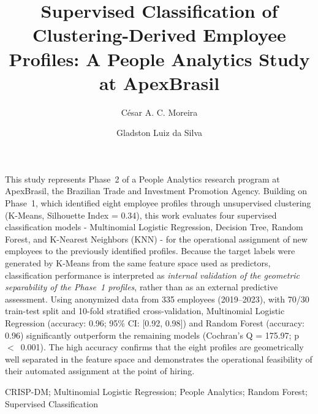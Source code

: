 \documentclass[alpha-refs,english]{RBCA_v3.0}
\title{Supervised Classification of Clustering-Derived Employee Profiles: A People Analytics Study at ApexBrasil}
\author[1]{C\'esar A. C. Moreira \orcid{0009-0001-0248-6791}}
\author[1]{Gladston Luiz da Silva \orcid{0000-0001-9650-2993}}
\affil[1]{Programa de P\'os-Gradua\c{c}\~ao em Computa\c{c}\~ao Aplicada, Universidade de Bras\'ilia (PPCA/UnB), Bras\'ilia, DF, Brazil}
\begin{document}
\begin{frontmatter}

\maketitle
\thispagestyle{empty}

\begin{Abstract}
This study represents Phase~2 of a People Analytics research program at ApexBrasil, the Brazilian Trade and Investment Promotion Agency. Building on Phase~1, which identified eight employee profiles through unsupervised clustering (K-Means, Silhouette Index = 0.34), this work evaluates four supervised classification models - Multinomial Logistic Regression, Decision Tree, Random Forest, and K-Nearest Neighbors (KNN) - for the operational assignment of new employees to the previously identified profiles. Because the target labels were generated by K-Means from the same feature space used as predictors, classification performance is interpreted as \textit{internal validation of the geometric separability of the Phase~1 profiles}, rather than as an external predictive assessment. Using anonymized data from 335 employees (2019--2023), with 70/30 train-test split and 10-fold stratified cross-validation, Multinomial Logistic Regression (accuracy: 0.96; 95\% CI: [0.92, 0.98]) and Random Forest (accuracy: 0.96) significantly outperform the remaining models (Cochran's Q = 175.97; p~$<$~0.001). The high accuracy confirms that the eight profiles are geometrically well separated in the feature space and demonstrates the operational feasibility of their automated assignment at the point of hiring.
\end{Abstract}

\begin{keywords}
CRISP-DM; Multinomial Logistic Regression; People Analytics; Random Forest; Supervised Classification
\end{keywords}


\end{frontmatter}
\end{document}

